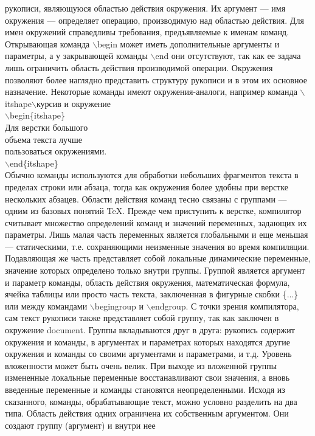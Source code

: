 \documentclass[a4paper, 14pt]{extarticle}
\begin{document}
	рукописи, являющуюся областью действия окружения. Их аргумент —
	имя окружения — определяет операцию, производимую над областью
	действия. Для имен окружений справедливы требования, предъявляемые к именам команд.
	Открывающая команда $\backslash$begin может иметь дополнительные аргументы и параметры, а у закрывающей команды $\backslash$end они отсутствуют,
	так как ее задача лишь ограничить область действия производимой операции. Окружения позволяют более наглядно представить структуру
	рукописи и в этом их основное назначение.
	Некоторые команды имеют окружения-аналоги, например команда
	{$\backslash$itshape$\backslash$курсив} и окружение\\
	$\backslash$begin\{itshape\}\\
		Для верстки большого\\
		объема текста лучше\\
		пользоваться окружениями.\\
	$\backslash$end\{itshape\}\\
	Обычно команды используются для обработки небольших фрагментов
	текста в пределах строки или абзаца, тогда как окружения более удобны
	при верстке нескольких абзацев.
	Области действия команд тесно связаны с группами — одним из
	базовых понятий \TeX. Прежде чем приступить к верстке, компилятор
	считывает множество определений команд и значений переменных,
	задающих их параметры. Лишь малая часть переменных является
	глобальными и еще меньшая — статическими, т.е. сохраняющими
	неизменные значения во время компиляции. Подавляющая же часть
	представляет собой локальные динамические переменные, значение
	которых определено только внутри группы.
	Группой является аргумент и параметр команды, область действия
	окружения, математическая формула, ячейка таблицы или просто часть
	текста, заключенная в фигурные скобки \{...\} или между командами
	$\backslash$begingroup и $\backslash$endgroup. С точки зрения компилятора, сам текст
	рукописи также представляет собой группу, так как заключен в окружение document. Группы вкладываются друг в друга: рукопись содержит
	окружения и команды, в аргументах и параметрах которых находятся
	другие окружения и команды со своими аргументами и параметрами,
	и т.д. Уровень вложенности может быть очень велик. При выходе из
	вложенной группы измененные локальные переменные восстанавливают свои значения, а вновь введенные переменные и команды становятся
	неопределенными.
	Исходя из сказанного, команды, обрабатывающие текст, можно
	условно разделить на два типа. Область действия одних ограничена их
	собственным аргументом. Они создают группу (аргумент) и внутри нее
\end{document}
